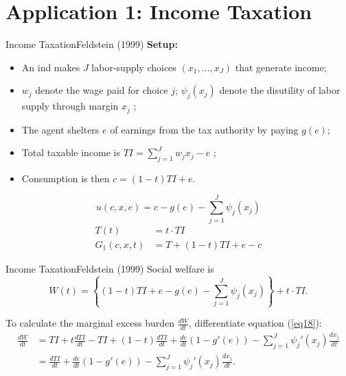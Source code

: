 \documentclass{beamer}
\begin{document}
\section{Application 1: Income Taxation}
\begin{frame}[shrink]
	\transfade %
	\tableofcontents[sectionstyle=show/shaded,subsectionstyle=show/shaded/hide]
	\addtocounter{framenumber}{-1}
\end{frame}
\begin{frame}{Income Taxation}{Feldstein (1999)}
	\textbf{Setup:}
	\begin{itemize}
		\item An ind makes $J$ labor-supply choices $(x_1,...,x_J)$ that generate income;
		\item $w_j$ denote the wage paid for choice $j$; $\psi_j(x_j)$ denote the disutility of labor supply through margin $x_j$ ;
		\item The agent shelters $e$ of earnings from the tax authority by paying $g(e)$;
		\item Total taxable income is $TI=\sum_{j=1}^Jw_jx_j-e$ ;
		\item Consumption is then $c = (1-t)TI+e$.
	\end{itemize}
	\begin{equation}
		u(c,x,e) = c-g(e)-\sum_{j=1}^J\psi_j(x_j)
	\end{equation}
	\begin{equation}
		\begin{aligned}
			T(t) &= t\cdot TI \\
			G_1(c,x,t) &= T + (1-t)TI + e - c
		\end{aligned}
	\end{equation}
\end{frame}
\begin{frame}{Income Taxation}{Feldstein (1999)}
	Social welfare is
	\begin{equation}\label{eq18}
		W(t) = \left\{(1-t)TI+e-g(e)-\sum_{j=1}^J\psi_j(x_j)\right\}+t\cdot TI.
	\end{equation}

	To calculate the marginal excess burden $\frac{dW}{dt}$, differentiate equation (\ref{eq18}):
	\begin{equation}\label{eq19}
		\begin{aligned}
			\frac{dW}{dt} &= TI + t\frac{dTI}{dt} - TI + (1-t)\frac{dTI}{dt}+\frac{de}{dt}(1-g'(e))-\sum_{j=1}^J\psi_j'(x_j)\frac{dx_j}{dt} \\
			&= \frac{dTI}{dt} + \frac{de}{dt}(1-g'(e)) - \sum_{j=1}^J\psi_j'(x_j)\frac{dx_j}{dt}.
		\end{aligned}
	\end{equation}
\end{frame}
\end{document}
